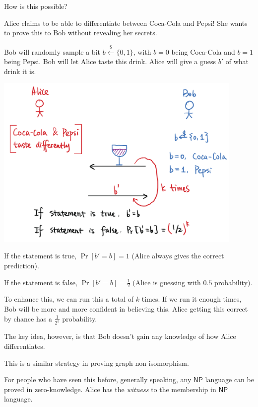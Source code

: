 How is this possible?
\begin{example*}
    Alice claims to be able to differentiate between Coca-Cola and Pepsi! She wants to prove this to Bob without revealing her secrets.

    Bob will randomly sample a bit $b\overset{\$}{\leftarrow}\{0, 1\}$, with $b=0$ being Coca-Cola and $b=1$ being Pepsi. Bob will let Alice taste this drink. Alice will give a guess $b'$ of what drink it is.

    \begin{center}
        \includegraphics[width=0.9\textwidth]{images/2023-01-26/zk_cola.png}
    \end{center}

    If the statement is true, $\Pr[b' = b] = 1$ (Alice always gives the correct prediction).

    If the statement is false, $\Pr[b' = b] = \frac{1}{2}$ (Alice is guessing with $0.5$ probability).

    To enhance this, we can run this a total of $k$ times. If we run it enough times, Bob will be more and more confident in believing this. Alice getting this correct by chance has a $\frac{1}{2^k}$ probability.

    The key idea, however, is that Bob doesn't gain any knowledge of how Alice differentiates.

    \begin{remark*}
        This is a similar strategy in proving graph non-isomorphism.

        For people who have seen this before, generally speaking, any $\textsf{NP}$ language can be proved in zero-knowledge. Alice has the \emph{witness} to the membership in $\textsf{NP}$ language.
    \end{remark*}
\end{example*}

